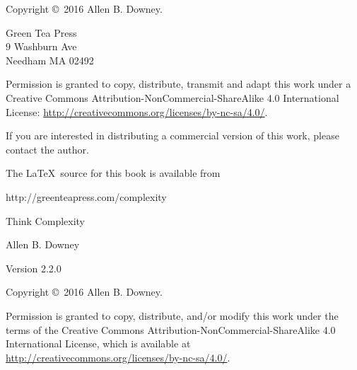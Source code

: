\documentclass[12pt]{book}
\newcommand{\thetitle}{Think Complexity}
\newcommand{\theauthors}{Allen B. Downey}
\newcommand{\theversion}{2.2.0}
\theoremstyle{exercise}
\begin{document}
\begin{latexonly}
\begin{flushright}
\vfill

\end{flushright}


\pagebreak
\thispagestyle{empty}

Copyright \copyright ~2016 \theauthors.



\vspace{0.2in}

\begin{flushleft}
Green Tea Press       \\
9 Washburn Ave \\
Needham MA 02492
\end{flushleft}

Permission is granted to copy, distribute, transmit and adapt
this work under a Creative Commons
Attribution-NonCommercial-ShareAlike 4.0 International License:
\url{http://creativecommons.org/licenses/by-nc-sa/4.0/}.

If you are interested in distributing a commercial version of this
work, please contact the author.

The \LaTeX\ source for this book is available from

\begin{code}
      http://greenteapress.com/complexity
\end{code}


\cleardoublepage
\setcounter{tocdepth}{1}
\tableofcontents

\end{latexonly}



\begin{htmlonly}

\vspace{1em}

{\Large \thetitle}

{\large \theauthors}

Version \theversion

\vspace{1em}

Copyright \copyright ~2016 \theauthors.

Permission is granted to copy, distribute, and/or modify this work
under the terms of the Creative Commons
Attribution-NonCommercial-ShareAlike 4.0 International License, which is
available at \url{http://creativecommons.org/licenses/by-nc-sa/4.0/}.

\vspace{1em}

\setcounter{chapter}{-1}

\end{htmlonly}
\end{document}
